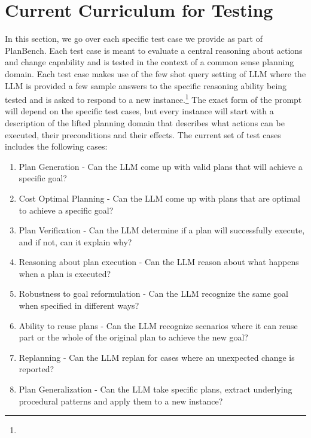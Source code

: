 \section{Current Curriculum for Testing}
In this section, we go over each specific test case we provide as part of PlanBench. 
Each test case is meant to evaluate a central reasoning about actions and change capability and is tested in the context of a common sense planning domain. Each test case makes use of the few shot query setting of LLM where the LLM is provided a few sample answers to the specific reasoning ability being tested and is asked to respond to a new instance.\footnote{} The exact form of the prompt will depend on the specific test cases, but every instance will start with a description of the lifted planning domain that describes what actions can be executed, their preconditions and their effects.
The current set of test cases includes the following cases: 
\begin{enumerate}
\item Plan Generation - Can the LLM come up with valid plans that will achieve a specific goal?

\item Cost Optimal Planning -  Can the LLM come up with plans that are optimal to achieve a specific goal?

\item Plan Verification - Can the LLM determine if a plan will successfully execute, and if not, can it explain why?

\item Reasoning about plan execution - Can the LLM reason about what happens when a plan is executed?

\item Robustness to goal reformulation - Can the LLM recognize the same goal when specified in different ways?

\item Ability to reuse plans - Can the LLM recognize scenarios where it can reuse part or the whole of the original plan to achieve the new goal?

\item Replanning - Can the LLM replan for cases where an unexpected change is reported?
\item Plan Generalization - Can the LLM take specific plans, extract underlying procedural patterns and apply them to a new instance?

\end{enumerate}
